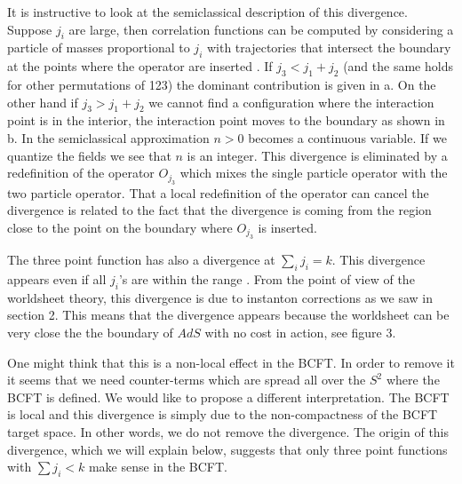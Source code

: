 It is instructive to
 look at the semiclassical description of this divergence.
Suppose $j_i$ are large, then
correlation functions can be computed by considering a particle of masses
proportional to $j_i$ with  trajectories
that intersect the boundary at the points where the operator are
inserted \wittensurfaces .
If $j_3 < j_1 + j_2$ (and the same holds for other permutations of 123)
the dominant contribution is given in \figone a. On the other hand
if $j_3> j_1+j_2$ we cannot find a configuration where the interaction
point is in the interior, the interaction point moves to the boundary as
shown in \figone b. In the semiclassical approximation
$n>0$ becomes a continuous variable. If  we quantize the
fields we see that $n$ is an integer.
This divergence is eliminated by  a redefinition of the operator
$O_{j_3}$ which mixes the single particle operator with the two particle
operator.
 That a local redefinition of the operator can cancel the
divergence is related to the fact that the divergence is coming from
the region close to the point on the boundary where $O_{j_3}$ is inserted.


The three point function has also a divergence at $\sum_i j_i = k$.
This divergence appears even if all $j_i$'s are within the
range \range.
{}From the point of view of the worldsheet theory,
this divergence is due to instanton corrections as
we saw in section 2. This means that the divergence appears because
the worldsheet can be very close the the boundary of $AdS$ with no cost
in action, see figure 3.

\ifig{}
{}

One  might  think that this is a  non-local
effect in the BCFT.  In order to remove it it seems
that we need counter-terms which are spread all over the $S^2$ where
the BCFT is defined. We would like to
propose a different interpretation.
The BCFT is local and  this divergence is simply
due to the non-compactness of
the BCFT target space. In other words, we do not remove the divergence.
The origin of this divergence, which we will explain
below, suggests that only three point functions with
$\sum j_i < k$ make sense in the BCFT.

